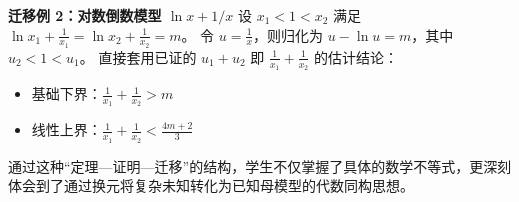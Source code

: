 \documentclass[11pt,a4paper]{ctexart}
\begin{document}
\textbf{迁移例 2：对数倒数模型 $\ln x + 1/x$}
设 $x_1 < 1 < x_2$ 满足 $\ln x_1 + \frac{1}{x_1} = \ln x_2 + \frac{1}{x_2} = m$。
令 $u = \frac{1}{x}$，则归化为 $u - \ln u = m$，其中 $u_2 < 1 < u_1$。
直接套用已证的 $u_1+u_2$ 即 $\frac{1}{x_1} + \frac{1}{x_2}$ 的估计结论：
\begin{itemize}
    \item 基础下界：$\frac{1}{x_1} + \frac{1}{x_2} > m$
    \item 线性上界：$\frac{1}{x_1} + \frac{1}{x_2} < \frac{4m+2}{3}$
\end{itemize}
通过这种“定理—证明—迁移”的结构，学生不仅掌握了具体的数学不等式，更深刻体会到了通过换元将复杂未知转化为已知母模型的代数同构思想。
\end{document}
